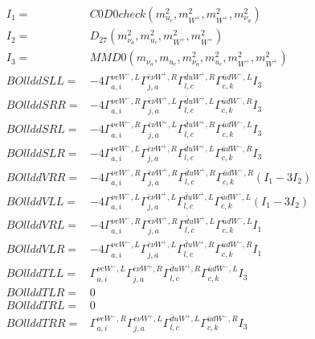 \documentclass[A4,landscape]{article}
\begin{document}
\begin{align} 
I_1 = & C0D0check(m^2_{u_{{c}}}, m^2_{W^+}, m^2_{W^+}, m^2_{\nu_{{a}}}) \\ 
I_2 = & D_{27}(m^2_{\nu_{{a}}}, m^2_{u_{{c}}}, m^2_{W^+}, m^2_{W^+}) \\ 
I_3 = & MMD0(m_{\nu_{{a}}}, m_{u_{{c}}}, m^2_{\nu_{{a}}}, m^2_{u_{{c}}}, m^2_{W^+}, m^2_{W^+}) \\ 
  BOllddSLL= & -4  \Gamma^{\nu e W^-,L}_{a, i} \Gamma^{\bar{e}\nu W^+ ,R}_{j, a} \Gamma^{\bar{d}u W^+ ,R}_{l, c} \Gamma^{\bar{u}d W^-,L}_{c, k} I_3 \\ 
  BOllddSRR= & -4  \Gamma^{\nu e W^-,R}_{a, i} \Gamma^{\bar{e}\nu W^+ ,L}_{j, a} \Gamma^{\bar{d}u W^+ ,L}_{l, c} \Gamma^{\bar{u}d W^-,R}_{c, k} I_3 \\ 
  BOllddSRL= & -4  \Gamma^{\nu e W^-,R}_{a, i} \Gamma^{\bar{e}\nu W^+ ,L}_{j, a} \Gamma^{\bar{d}u W^+ ,R}_{l, c} \Gamma^{\bar{u}d W^-,L}_{c, k} I_3 \\ 
  BOllddSLR= & -4  \Gamma^{\nu e W^-,L}_{a, i} \Gamma^{\bar{e}\nu W^+ ,R}_{j, a} \Gamma^{\bar{d}u W^+ ,L}_{l, c} \Gamma^{\bar{u}d W^-,R}_{c, k} I_3 \\ 
  BOllddVRR= & -4  \Gamma^{\nu e W^-,R}_{a, i} \Gamma^{\bar{e}\nu W^+ ,R}_{j, a} \Gamma^{\bar{d}u W^+ ,R}_{l, c} \Gamma^{\bar{u}d W^-,R}_{c, k} (I_1 - 3 I_2) \\ 
  BOllddVLL= & -4  \Gamma^{\nu e W^-,L}_{a, i} \Gamma^{\bar{e}\nu W^+ ,L}_{j, a} \Gamma^{\bar{d}u W^+ ,L}_{l, c} \Gamma^{\bar{u}d W^-,L}_{c, k} (I_1 - 3 I_2) \\ 
  BOllddVRL= & -4  \Gamma^{\nu e W^-,R}_{a, i} \Gamma^{\bar{e}\nu W^+ ,R}_{j, a} \Gamma^{\bar{d}u W^+ ,L}_{l, c} \Gamma^{\bar{u}d W^-,L}_{c, k} I_1 \\ 
  BOllddVLR= & -4  \Gamma^{\nu e W^-,L}_{a, i} \Gamma^{\bar{e}\nu W^+ ,L}_{j, a} \Gamma^{\bar{d}u W^+ ,R}_{l, c} \Gamma^{\bar{u}d W^-,R}_{c, k} I_1 \\ 
  BOllddTLL= &  \Gamma^{\nu e W^-,L}_{a, i} \Gamma^{\bar{e}\nu W^+ ,R}_{j, a} \Gamma^{\bar{d}u W^+ ,R}_{l, c} \Gamma^{\bar{u}d W^-,L}_{c, k} I_3 \\ 
  BOllddTLR= & 0 \\ 
  BOllddTRL= & 0 \\ 
  BOllddTRR= &  \Gamma^{\nu e W^-,R}_{a, i} \Gamma^{\bar{e}\nu W^+ ,L}_{j, a} \Gamma^{\bar{d}u W^+ ,L}_{l, c} \Gamma^{\bar{u}d W^-,R}_{c, k} I_3 \\ 
\end{align} 
\end{document}
